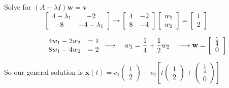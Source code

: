 \documentclass[12pt]{article}
\begin{document}
\begin{enumerate}
    \hspace*{2cm}Solve for $ (A - \lambda I)\mathbf{w} = \mathbf{v}$ \\ 
    $\hspace*{2cm}\left[\begin{array}{cc} 4 - \lambda_1 & -2\\ 8 & -4 - \lambda_1\end{array}\right]
    \rightarrow \left[\begin{array}{rr} 4& -2\\ 8 & -4 \end{array}\right] \left[\begin{array}{cc} w_1 \\ w_2 \end{array}\right] = \left[\begin{array}{cc} 1 \\ 2 \end{array}\right]$

    $\hspace*{2cm}\begin{array}{rr} 4w_1 - 2w_2 &=1 \\ 8w_1 - 4w_2 &=2 \end{array} 
    \longrightarrow \quad w_1=\dfrac{1}{4} + \dfrac{1}{2}w_2 \quad \longrightarrow \mathbf{w} =\left[\begin{array}{cc} \frac{1}{4} \\ 0 \end{array}\right]$

    So our general solution is $\mathbf{x}(t) = c_1\begin{pmatrix} 1 \\ 2 \end{pmatrix}+ c_2\left[ t \begin{pmatrix} 1 \\ 2 \end{pmatrix} + \begin{pmatrix} \frac{1}{4} \\ 0 \end{pmatrix}\right]$


\end{enumerate}
\end{document}
